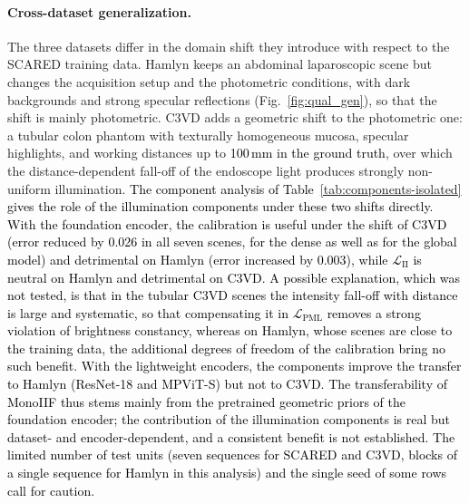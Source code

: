 \documentclass[a4paper,fleqn]{cas-dc}
\begin{document}
{\paragraph{Cross-dataset generalization.}
The three datasets differ in the domain shift they introduce with respect to the SCARED training data. Hamlyn keeps an abdominal laparoscopic scene but changes the acquisition setup and the photometric conditions, with dark backgrounds and strong specular reflections (Fig.~\ref{fig:qual_gen}), so that the shift is mainly photometric. C3VD adds a geometric shift to the photometric one: a tubular colon phantom with texturally homogeneous mucosa, specular highlights, and working distances up to \textcolor{black}{100\,mm in the ground truth}, over which the distance-dependent fall-off of the endoscope light produces strongly non-uniform illumination. \textcolor{black}{The component analysis of Table~\ref{tab:components-isolated} gives the role of the illumination components under these two shifts directly. With the foundation encoder, the calibration is useful under the shift of C3VD (error reduced by 0.026 in all seven scenes, for the dense as well as for the global model) and detrimental on Hamlyn (error increased by 0.003), while $\mathcal{L}_\textrm{II}$ is neutral on Hamlyn and detrimental on C3VD. A possible explanation, which was not tested, is that in the tubular C3VD scenes the intensity fall-off with distance is large and systematic, so that compensating it in $\mathcal{L}_\textrm{PML}$ removes a strong violation of brightness constancy, whereas on Hamlyn, whose scenes are close to the training data, the additional degrees of freedom of the calibration bring no such benefit. With the lightweight encoders, the components improve the transfer to Hamlyn (ResNet-18 and MPViT-S) but not to C3VD. The transferability of MonoIIF thus stems mainly from the pretrained geometric priors of the foundation encoder; the contribution of the illumination components is real but dataset- and encoder-dependent, and a consistent benefit is not established. The limited number of test units (seven sequences for SCARED and C3VD, blocks of a single sequence for Hamlyn in this analysis) and the single seed of some rows call for caution.}}
\end{document}
